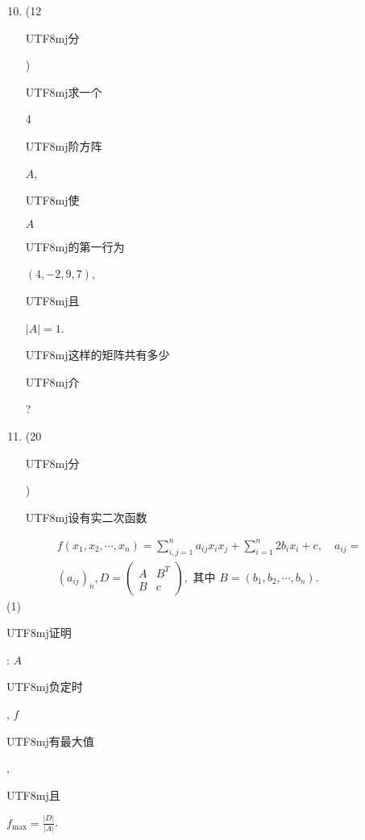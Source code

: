 \documentclass[10pt]{article}
\begin{document}
\begin{enumerate}
  \setcounter{enumi}{9}
  \item (12 \begin{CJK}{UTF8}{mj}分\end{CJK}) \begin{CJK}{UTF8}{mj}求一个\end{CJK} 4 \begin{CJK}{UTF8}{mj}阶方阵\end{CJK} $A$, \begin{CJK}{UTF8}{mj}使\end{CJK} $A$ \begin{CJK}{UTF8}{mj}的第一行为\end{CJK} $(4,-2,9,7)$, \begin{CJK}{UTF8}{mj}且\end{CJK} $|A|=1$. \begin{CJK}{UTF8}{mj}这样的矩阵共有多少\end{CJK} \begin{CJK}{UTF8}{mj}介\end{CJK}?

  \item (20 \begin{CJK}{UTF8}{mj}分\end{CJK}) \begin{CJK}{UTF8}{mj}设有实二次函数\end{CJK}

\end{enumerate}
$$
\begin{gathered}
f\left(x_{1}, x_{2}, \cdots, x_{n}\right)=\sum_{i, j=1}^{n} a_{i j} x_{i} x_{j}+\sum_{i=1}^{n} 2 b_{i} x_{i}+c, \quad a_{i j}= \\
\left(a_{i j}\right)_{n}, D=\left(\begin{array}{cc}
A & B^{T} \\
B & c
\end{array}\right), \text { 其中 } B=\left(b_{1}, b_{2}, \cdots, b_{n}\right) .
\end{gathered}
$$
(1) \begin{CJK}{UTF8}{mj}证明\end{CJK}: $A$ \begin{CJK}{UTF8}{mj}负定时\end{CJK}, $f$ \begin{CJK}{UTF8}{mj}有最大值\end{CJK}, \begin{CJK}{UTF8}{mj}且\end{CJK} $f_{\max }=\frac{|D|}{|A|}$.
\end{document}
